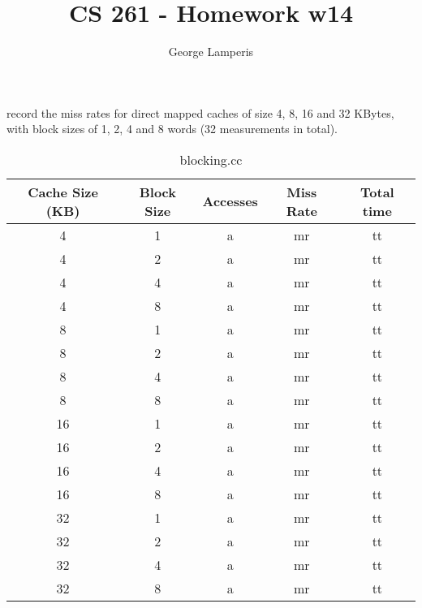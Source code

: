 \documentclass[letterpaper, 12pt, oneside]{memoir}
\title{CS 261 - Homework w14}
\author{George Lamperis}
\date{}
\begin{document}
\maketitle

record the miss rates for direct mapped caches of size 4, 8, 16 and 32 KBytes,
with block sizes of 1, 2, 4 and 8 words (32 measurements in total). 

\begin{table}[H]
\centering
\begin{tabular}{c|c|c|c|c}
    Cache Size (KB)  & Block Size & Accesses & Miss Rate & Total time \\ \hline 
    4  & 1 & a & mr & tt \\ 
    4  & 2 & a & mr & tt \\ 
    4  & 4 & a & mr & tt \\ 
    4  & 8 & a & mr & tt \\ \hline
    8  & 1 & a & mr & tt \\ 
    8  & 2 & a & mr & tt \\ 
    8  & 4 & a & mr & tt \\ 
    8  & 8 & a & mr & tt \\ \hline
    16 & 1 & a & mr & tt \\ 
    16 & 2 & a & mr & tt \\ 
    16 & 4 & a & mr & tt \\ 
    16 & 8 & a & mr & tt \\ \hline
    32 & 1 & a & mr & tt \\ 
    32 & 2 & a & mr & tt \\ 
    32 & 4 & a & mr & tt \\ 
    32 & 8 & a & mr & tt \\ 
\end{tabular}
\caption{blocking.cc}
\end{table}
\end{document}
